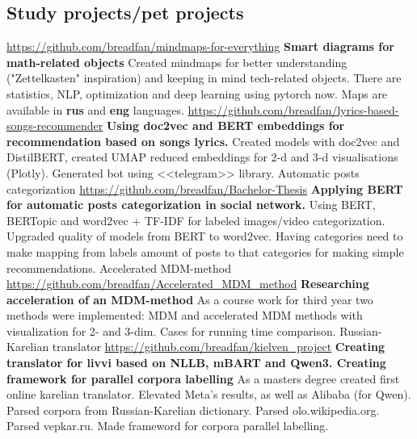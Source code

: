 \documentclass[11pt,a4paper]{moderncv}
\begin{document}
  \subsection{Study projects/pet projects}
  {\url{https://github.com/breadfan/mindmaps-for-everything}\newline{}
  	\textbf{Smart diagrams for math-related objects}\newline{}
  	Created mindmaps for better understanding ("Zettelkasten" inspiration) and keeping in mind tech-related objects. There are statistics, NLP, optimization and deep learning using pytorch now. Maps are available in \textbf{rus} and \textbf{eng} languages.	  
  }
  {\url{https://github.com/breadfan/lyrics-based-songs-recommender}\newline{}
  	\textbf{Using doc2vec and BERT embeddings for recommendation based on songs lyrics.}\newline{}
  	Created models with doc2vec and DistilBERT, created UMAP reduced embeddings for 2-d and 3-d visualisations (Plotly). Generated bot using <<telegram>> library.	  
  }
	\cvline
	{Automatic posts categorization}
	{\url{https://github.com/breadfan/Bachelor-Thesis}\newline{}
		\textbf{Applying BERT for automatic posts categorization in social network.} \newline{}
		Using BERT, BERTopic and word2vec + TF-IDF for labeled images/video categorization. \newline{}
		Upgraded quality of models from BERT to word2vec.\newline{}
		Having categories need to make mapping from labels amount of posts to that categories for making simple recommendations.
  }
  \cvline
  {Accelerated MDM-method}
  {\url{https://github.com/breadfan/Accelerated_MDM_method}\newline{}
  	\textbf{Researching acceleration of an MDM-method}\newline{}
  	As a course work for third year two methods were implemented: MDM and accelerated MDM methods with visualization for 2- and 3-dim. Cases for running time comparison.}
	\cvline
	{Russian-Karelian translator}
	{\url{https://github.com/breadfan/kielven_project}\newline{}
		\textbf{Creating translator for livvi based on NLLB, mBART and Qwen3. Creating framework for parallel corpora labelling}\newline{}
		As a masters degree created first online karelian translator. Elevated Meta's results, as well as Alibaba (for Qwen). Parsed corpora from Russian-Karelian dictionary. Parsed olo.wikipedia.org. Parsed vepkar.ru. Made frameword for corpora parallel labelling.}
  	
\end{document}
